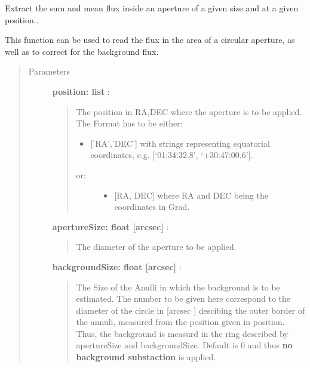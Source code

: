 \documentclass[a4paper,10pt,english]{sphinxmanual}
\begin{document}
\begin{fulllineitems}
\begin{fulllineitems}
\label{maps:astrolyze.maps.fits.FitsMap.read_aperture}
Extract the sum and mean flux inside an aperture of a given size
and at a given position..

This function can be used to read the flux in the area of a circular
aperture, as well as to correct for the background flux.
\begin{quote}\begin{description}
\item[{Parameters }] \leavevmode
\textbf{position: list} :
\begin{quote}

The position in RA,DEC where the aperture is to be applied.
The Format has to be either:
\begin{itemize}
\item {} 
{[}'RA','DEC'{]} with strings representing equatorial
coordinates, e.g. {[}`01:34:32.8', `+30:47:00.6'{]}.

\end{itemize}
\begin{description}
\item[{or:}] \leavevmode\begin{itemize}
\item {} 
{[}RA, DEC{]} where RA and DEC being the coordinates in Grad.

\end{itemize}

\end{description}
\end{quote}

\textbf{apertureSize: float {[}arcsec{]}} :
\begin{quote}

The diameter of the aperture to be applied.
\end{quote}

\textbf{backgroundSize: float {[}arcsec{]}} :
\begin{quote}

The Size of the Anulli in which the background is to be
estimated. The number to be given here correspond to the diameter
of the circle in {[}arcsec {]} descibing the outer border of the
annuli, measured from the position given in position. Thus, the
background is measurd in the ring described by apertureSize and
backgroundSize. Default is 0 and thus \textbf{no background substaction}
is applied.
\end{quote}


\end{description}
\end{quote}
\end{fulllineitems}
\end{fulllineitems}
\end{document}
